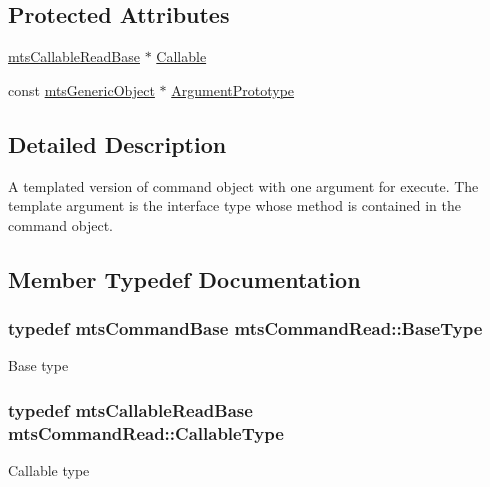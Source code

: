 \subsection*{Protected Attributes}
\begin{DoxyCompactItemize}
\item 
\hyperlink{classmts_callable_read_base}{mts\+Callable\+Read\+Base} $\ast$ \hyperlink{classmts_command_read_aa99a8b6be2493dfffc746078347ae0c8}{Callable}
\item 
const \hyperlink{classmts_generic_object}{mts\+Generic\+Object} $\ast$ \hyperlink{classmts_command_read_ab99241122421dce8a29351f19b97e8c0}{Argument\+Prototype}
\end{DoxyCompactItemize}


\subsection{Detailed Description}
A templated version of command object with one argument for execute. The template argument is the interface type whose method is contained in the command object. 

\subsection{Member Typedef Documentation}
\hypertarget{classmts_command_read_a40bc517108c9ab125caf8477013eda34}{}
\subsubsection[{Base\+Type}]{\setlength{\rightskip}{0pt plus 5cm}typedef {\bf mts\+Command\+Base} {\bf mts\+Command\+Read\+::\+Base\+Type}}\label{classmts_command_read_a40bc517108c9ab125caf8477013eda34}
Base type \hypertarget{classmts_command_read_a5949311ea142c1c13cb29242c5151da6}{}
\subsubsection[{Callable\+Type}]{\setlength{\rightskip}{0pt plus 5cm}typedef {\bf mts\+Callable\+Read\+Base} {\bf mts\+Command\+Read\+::\+Callable\+Type}}\label{classmts_command_read_a5949311ea142c1c13cb29242c5151da6}
Callable type \hypertarget{classmts_command_read_aec958a1f6afb4ec00138f7867a1e25b9}{}
